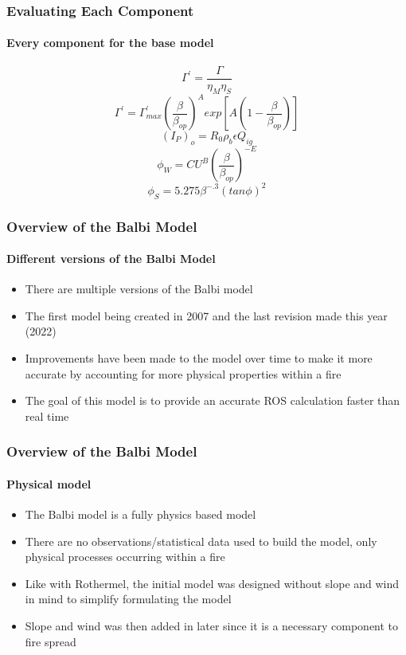 \documentclass{beamer}
\begin{document}
	\begin{frame}
			\frametitle{Evaluating Each Component}
	\framesubtitle{Every component for the base model}
	 \begin{equation}
 	\label{gamma '}
 	\Gamma ^ {'} = \frac {\Gamma} {\eta _ M \eta _ S}
 \end{equation}
\begin{equation}
	\label{Final Reaction Velocity}
	\Gamma ^ {'} = \Gamma ^ {'}_{max} (\frac {\beta} {\beta _ {op}}) ^ {A} exp[A(1 - \frac {\beta} {\beta _ {op}})]
\end{equation}
\begin{equation}
	\label{Propagating flux with i0}
	(I_P)_o = R_0 \rho _ b \epsilon Q_{ig}
\end{equation}
	\begin{equation}
	\label{wind coefficient}
	\phi _ W = C U^{B} (\frac {\beta} {\beta_{op}}) ^ {-E}
\end{equation}
\begin{equation}
	\label{Slope coefficient}
	\phi _ S = 5.275 \beta ^ {-.3} (tan \phi)^{2}
\end{equation}
	\end{frame}
	
	\begin{frame}

	\frametitle{Overview of the Balbi Model}
	\framesubtitle{Different versions of the Balbi Model}
	\begin{itemize}
	\setlength{\itemsep}{7mm}
		\item There are multiple versions of the Balbi model
		\item The first model being created in 2007 and the last revision made this year (2022)
		\item Improvements have been made to the model over time to make it more accurate by accounting for more physical properties within a fire
		\item The goal of this model is to provide an accurate ROS calculation faster than real time
	\end{itemize}
	\end{frame}
\begin{frame}
	\frametitle{Overview of the Balbi Model}
	\framesubtitle{Physical model}
	
	\begin{itemize}
	\setlength{\itemsep}{7mm}
		\item The Balbi model is a fully physics based model
		\item There are no observations/statistical data used to build the model, only physical processes occurring within a fire
		\item Like with Rothermel, the initial model was designed without slope and wind in mind to simplify formulating the model
		\item Slope and wind was then added in later since it is a necessary component to fire spread
	\end{itemize}
\end{frame}
\end{document}
